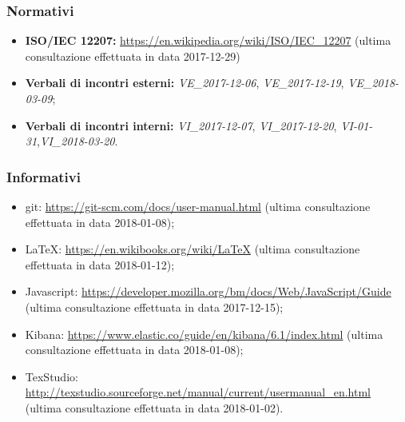 	\subsubsection{Normativi}
		\begin{itemize}
			\item \textbf{ISO/IEC 12207:} \href{https://en.wikipedia.org/wiki/ISO/IEC\_12207}{https://en.wikipedia.org/wiki/ISO/IEC\_12207} (ultima consultazione effettuata in data 2017-12-29)
			\item \textbf{Verbali di incontri esterni:} \emph{VE\_2017-12-06}, \emph{VE\_2017-12-19}, \emph{VE\_2018-03-09};
			\item \textbf{Verbali di incontri interni:}	\emph{VI\_2017-12-07}, \emph{VI\_2017-12-20}, \emph{VI-01-31},\newline \emph{VI\_2018-03-20}.
		\end{itemize}
	\subsubsection{Informativi}
	\begin{itemize}
		\item git:
		\href{https://git-scm.com/docs/user-manual.html}{https://git-scm.com/docs/user-manual.html} (ultima consultazione effettuata in data 2018-01-08);
		
		\item \LaTeX:  \href{https://en.wikibooks.org/wiki/LaTeX}{https://en.wikibooks.org/wiki/LaTeX} (ultima consultazione effettuata in data 2018-01-12);
		
		\item Javascript:
		\href{https://developer.mozilla.org/bm/docs/Web/JavaScript/Guide}{https://developer.mozilla.org/bm/docs/Web/JavaScript/Guide} (ultima consultazione effettuata in data 2017-12-15);
		
		\item Kibana: \href{https://www.elastic.co/guide/en/kibana/6.1/index.html}{https://www.elastic.co/guide/en/kibana/6.1/index.html} (ultima consultazione effettuata in data 2018-01-08);
		
		\item TexStudio: 
		\href{http://texstudio.sourceforge.net/manual/current/usermanual\_en.html}{http://texstudio.sourceforge.net/manual/current/usermanual\_en.html} (ultima consultazione effettuata in data 2018-01-02).
	\end{itemize}
	